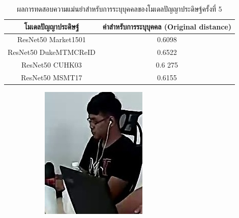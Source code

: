 \begin{table}[!ht]
    \centering
    \begin{tabular}{|c|c|}
		\hline
		{โมเดลปัญญาประดิษฐ์}&{ค่าสำหรับการระบุบุคคล (Original distance)}							\\
		\hline
		ResNet50 Market1501	 			& 0.6098								\\
		ResNet50 DukeMTMCReID			& 0.6522								\\
		ResNet50 CUHK03				& 0.6	275								\\
		ResNet50 MSMT17				& 0.6155								\\
	\hline
    \end{tabular}
    \caption{ผลการทดสอบความแม่นยำสำหรับการระบุบุคคลของโมเดลปัญญาประดิษฐ์ครั้งที่ 5}
    \label{tab: Original distant of image 5}
\end{table}
\clearpage
\begin{figure}[!ht]
    \centering
    \begin{subfigure}[b]{0.2\textwidth}
        \centering
        \includegraphics[width=\textwidth]{chapter4/images/fei_4.jpg}

\end{subfigure}
\end{figure}
